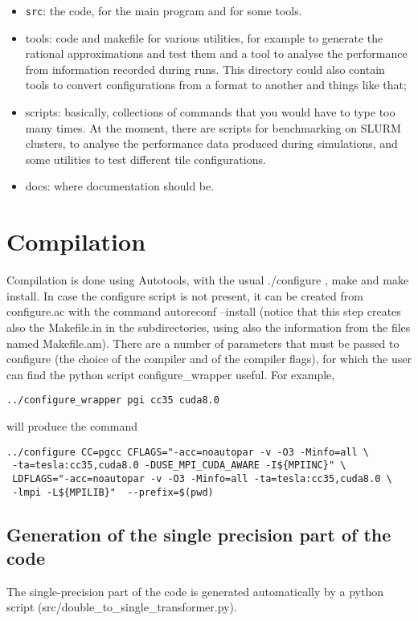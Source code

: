 \begin{itemize}
    \item \texttt{src}: the code, for the main program and for some tools.
    \item tools: code and makefile for various utilities, for example to generate the rational approximations and test them and a tool to analyse the performance from information recorded during runs. This directory could also contain tools to convert configurations from a format to another and things like that; 
    \item scripts: basically, collections of commands that you would have to type too many times. 
    At the moment, there are scripts for benchmarking on SLURM clusters, to analyse the performance data produced during simulations,
    and some utilities to test different {\sf tile} configurations.
    \item docs: where documentation should be.
\end{itemize}
\section{Compilation}
\label{compilation}
Compilation is done using Autotools, with the usual {\sf ./configure} , {\sf make} and {\sf make install}.
In case the {\sf configure} script is not present, it can be created from {\sf configure.ac} 
with the command{ \sf autoreconf --install} (notice that this step creates also the {\sf Makefile.in} in the subdirectories, 
using also the information from the files named {\sf Makefile.am}). 
There are a number of parameters that must be passed to {\sf configure} (the choice of the compiler and of the compiler flags), for which the user can find the python script {\sf configure\_wrapper} useful. For example,
\begin{verbatim}
../configure_wrapper pgi cc35 cuda8.0
\end{verbatim}
will produce the command
\begin{verbatim}
../configure CC=pgcc CFLAGS="-acc=noautopar -v -O3 -Minfo=all \
 -ta=tesla:cc35,cuda8.0 -DUSE_MPI_CUDA_AWARE -I${MPIINC}" \
 LDFLAGS="-acc=noautopar -v -O3 -Minfo=all -ta=tesla:cc35,cuda8.0 \
 -lmpi -L${MPILIB}"  --prefix=$(pwd)
\end{verbatim}

\subsection{Generation of the single precision part of the code}
The single-precision part of the code is generated automatically 
by a python script ({\sf src/double\_to\_single\_transformer.py}).

